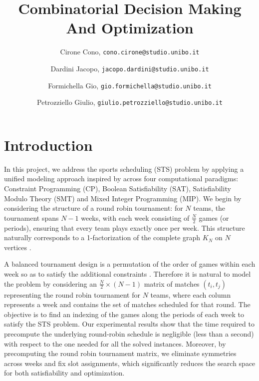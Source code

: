 \documentclass{article}
\title{Combinatorial Decision Making And Optimization}
\author{
  Cirone Cono, \texttt{cono.cirone@studio.unibo.it}
  \and
  Dardini Jacopo, \texttt{jacopo.dardini@studio.unibo.it}
  \and
  Formichella Gio, \texttt{gio.formichella@studio.unibo.it}
  \and
  Petrozziello Giulio, \texttt{giulio.petrozziello@studio.unibo.it} 
}
\date{}
\begin{document}
\maketitle


\section{Introduction}
In this project, we address the sports scheduling (STS) problem by applying a unified modeling approach inspired by \cite{10.1007/10704567_6} across four computational paradigms: Constraint Programming (CP), Boolean Satisfiability (SAT), Satisfiability Modulo Theory (SMT) and Mixed Integer Programming (MIP).
We begin by considering the structure of a round robin tournament: for $N$ teams, the tournament spans $N-1$ weeks, with each week consisting of $\frac{N}{2}$ games (or periods), ensuring that every team plays exactly once per week. This structure naturally corresponds to a 1-factorization of the complete graph $K_N$ on $N$ vertices \cite{Dinitz2006RoundRobin}.

A balanced tournament design is a permutation of the order of games within each week so as to satisfy the additional constraints \cite{Lamken2006BalancedTournamentDesigns}. 
Therefore it is natural to model the problem by considering an $\frac{N}{2}\times(N-1)$ matrix of matches $(t_i, t_j)$ representing the round robin tournament for $N$ teams, where each column represents a week and contains the set of matches scheduled for that round.
The objective is to find an indexing of the games along the periods of each week to satisfy the STS problem.
Our experimental results show that the time required to precompute the underlying round-robin schedule is negligible (less than a second) with respect to the one needed for all the solved instances.
Moreover, by precomputing the round robin tournament matrix, we eliminate symmetries across weeks and fix slot assignments, which significantly reduces the search space for both satisfiability and optimization.
\end{document}
